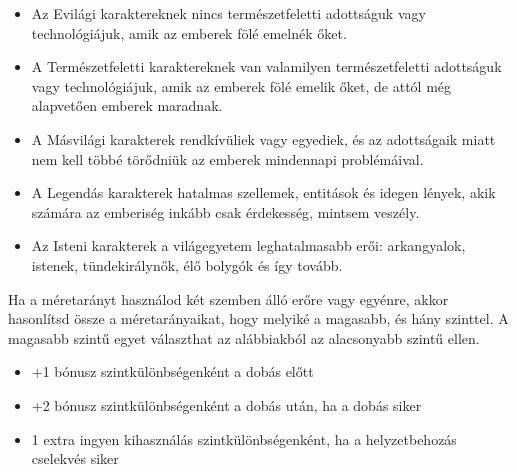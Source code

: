 \documentclass[oneside]{book}
\begin{document}
\begin{itemize}
    \item Az Evilági karaktereknek nincs természetfeletti adottságuk vagy technológiájuk, amik az emberek fölé emelnék őket.
    \item A Természetfeletti karaktereknek van valamilyen természetfeletti adottságuk vagy technológiájuk, amik az emberek fölé emelik őket, de attól még alapvetően emberek maradnak.
    \item A Másvilági karakterek rendkívüliek vagy egyediek, és az adottságaik miatt nem kell többé törődniük az emberek mindennapi problémáival.
    \item A Legendás karakterek hatalmas szellemek, entitások és idegen lények, akik számára az emberiség inkább csak érdekesség, mintsem veszély.
    \item Az Isteni karakterek a világegyetem leghatalmasabb erői: arkangyalok, istenek, tündekirálynők, élő bolygók és így tovább.
\end{itemize}

Ha a méretarányt használod két szemben álló erőre vagy egyénre, akkor hasonlítsd össze a méretarányaikat, hogy melyiké a magasabb, és hány szinttel. A magasabb szintű egyet választhat az alábbiakból az alacsonyabb szintű ellen.

\begin{itemize}
    \item +1 bónusz szintkülönbségenként a dobás előtt
    \item +2 bónusz szintkülönbségenként a dobás után, ha a dobás siker
    \item 1 extra ingyen kihasználás szintkülönbségenként, ha a helyzetbehozás cselekvés siker
\end{itemize}
\end{document}
